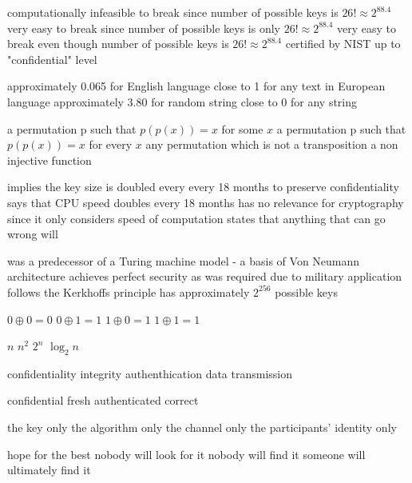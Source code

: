 {computationally infeasible to break since number of possible keys is $26! \approx 2^{88.4}$}
{very easy to break since number of possible keys is only $26! \approx 2^{88.4}$}
{very easy to break even though number of possible keys is $26! \approx 2^{88.4}$}
{certified by NIST up to "confidential" level}

 {approximately 0.065 for English language}
 {close to 1 for any text in European language}
 {approximately 3.80 for random string}
 {close to 0 for any string}
 
{a permutation p such that $p(p(x)) = x$ for some $x$}
{a permutation p such that $p(p(x)) = x$ for every $x$}
{any permutation which is not a transposition}
{a non injective function}

 {implies the key size is  doubled every every 18 months to preserve confidentiality}
 {says that CPU speed doubles every 18 months}
 {has no relevance for cryptography since it only considers speed of computation}
 {states that anything that can go wrong will}
 
  {was a predecessor of a Turing machine model - a basis of Von Neumann architecture}
  {achieves perfect security as was required due to military application}
  {follows the Kerkhoffs principle}
  {has approximately $2^{256}$ possible keys}
  
{$0\oplus 0 = 0$}
{$0\oplus 1 = 1$}
{$1\oplus 0 = 1$}
{$1\oplus 1 = 1$}

{$n$}
{$n^2$}
{$2^n$}
{$\log_2 n$}

{confidentiality}
{integrity}
{authenthication}
{data transmission}

{confidential}
{fresh}
{authenticated}
{correct}

{the key only}
{the algorithm only}
{the channel only}
{the participants' identity only}

{hope for the best}
{nobody will look for it}
{nobody will find it}
{someone will ultimately find it}

